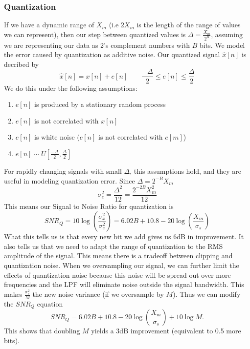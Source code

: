\subsubsection{Quantization}
If we have a dynamic range of $X_m$ (i.e $2X_m$ is the length of the range of values we can represent), then
our step between quantized values is $\Delta=\frac{X_m}{2^B}$, assuming we are representing our data as 2's complement 
numbers with $B$ bits. We model the error caused by quantization as additive noise. Our quantized signal $\hat{x}[n]$ is decribed by
\[
  \hat{x}[n] = x[n] + e[n] \qquad \frac{-\Delta}{2}\le e[n] \le \frac{\Delta}{2}
\]
We do this under the following assumptions:
\begin{enumerate}
  \item $e[n]$ is produced by a stationary random process
  \item $e[n]$ is not correlated with $x[n]$
  \item $e[n]$ is white noise ($e[n]$ is not correlated with $e[m]$)
  \item $e[n]\sim U\left[\frac{-\Delta}{2},\frac{\Delta}{2}\right]$ 
\end{enumerate}
For rapidly changing signals with small $\Delta$, this assumptions hold, and they are useful in modeling quantization error.
Since $\Delta = 2^{-B}X_m$
\[
  \sigma^2_e=\frac{\Delta^2}{12}=\frac{2^{-2B}X_m^2}{12}
\]
This means our Signal to Noise Ratio for quantization is
\[
  SNR_Q=10\log\left(\frac{\sigma_x^2}{\sigma_e^2}\right)=6.02B+10.8-20\log\left(\frac{X_m}{\sigma_s}\right)
\]
What this tells us is that every new bit we add gives us 6dB in improvement. It also tells us that we need to
adapt the range of quantization to the RMS amplitude of the signal. This means there is a tradeoff between clipping and quantization noise.
When we oversampling our signal, we can further limit the effects of quantization noise because this noise will be spread out over more frequencies
and the LPF will eliminate noise outside the signal bandwidth. This makes $\frac{\sigma_e^2}{M}$ the new noise variance (if we oversample by $M$).
Thus we can modify the $SNR_Q$ equation
\[
  SNR_Q=6.02B+10.8-20\log\left(\frac{X_m}{\sigma_s}\right) + 10\log M.
\]
This shows that doubling $M$ yields a 3dB improvement (equivalent to 0.5 more bits).
